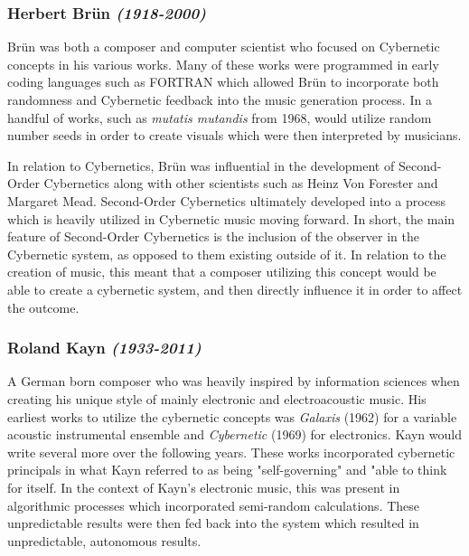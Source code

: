 \subsubsection{Herbert Brün \textit{(1918-2000)}} %

Brün was both a composer and computer scientist who focused on Cybernetic concepts in his various works. Many of these works were programmed in early coding languages such as FORTRAN which allowed Brün to incorporate both randomness and Cybernetic feedback into the music generation process. In a handful of works, such as \textit{mutatis mutandis} from 1968, would utilize random number seeds in order to create visuals which were then interpreted by musicians.

In relation to Cybernetics, Brün was influential in the development of Second-Order Cybernetics along with other scientists such as Heinz Von Forester and Margaret Mead. Second-Order Cybernetics ultimately developed into a process which is heavily utilized in Cybernetic music moving forward. In short, the main feature of Second-Order Cybernetics is the inclusion of the observer in the Cybernetic system, as opposed to them existing outside of it\cite{Scott_2nd_order_Cyber}. In relation to the creation of music, this meant that a composer utilizing this concept would be able to create a cybernetic system, and then directly influence it in order to affect the outcome.


\subsubsection{Roland Kayn \textit{(1933-2011)}} %

A German born composer who was heavily inspired by information sciences when creating his unique style of mainly electronic and electroacoustic music\cite{rolandKaynBio}. His earliest works to utilize the cybernetic concepts was \textit{Galaxis} (1962) for a variable acoustic instrumental ensemble and \textit{Cybernetic} (1969) for electronics. Kayn would write several more over the following years. These works incorporated cybernetic principals in what Kayn referred to as being "self-governing"\cite{rolandKaynBio} and "able to think for itself\cite{Kayn_Elektroakustische_Projekte}. In the context of Kayn's electronic music, this was present in algorithmic processes which incorporated semi-random calculations. These unpredictable results were then fed back into the system which resulted in unpredictable, autonomous results\cite{rolandKaynBio}.

